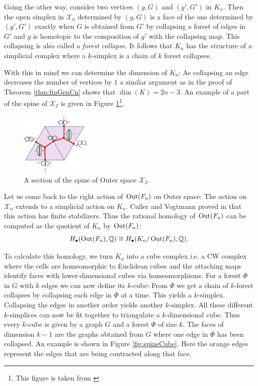 Going the other way, consider two vertices $(g,G)$ and $(g',G')$ in $K_{n}$. Then the open simplex in $\mathcal{X}_{n}$ 
determined by $(g,G)$ is a face of  the one determined by $(g',G')$ exactly when $G$ is obtained from $G'$ 
by collapsing a forest of edges in $G'$ and  $g$ is homotopic to the composition of $g'$ with the collapsing map.
This collapsing is also called a \emph{forest collapse}.
It follows that $K_{n}$ has the structure of a simplicial complex where a $k$-simplex is a chain of $k$ forest collapses. 

With this in mind we can determine the dimension of $K_{n}$: As collapsing an edge decreases the number of vertices by $1$
a similar argument as in the proof of Theorem \ref{thm:finGenCn} shows that $\dim(K) = 2n -3$.
An example of a part of the spine of $\mathcal{X}_{2}$ is given in Figure \ref{fig:SpineOfXn}\footnote{This figure is taken from \cite{vogtmann02}}. 

\begin{figure}[h]
	\centering
	\includegraphics[width=0.3\textwidth]{./Images/spineOfOuterSpace.pdf}
	\caption{A section of the spine of Outer space $\mathcal{X}_{2}$.}
	\label{fig:SpineOfXn}
\end{figure}

Let us come back to the right action of $\operatorname{Out}(F_{n})$ on Outer space: The action on $\mathcal{X}_{n}$ extends to a simplicial action on $K_{n}$.
Culler and Vogtmann proved in \cite{vogtmann86} that this action has finite stabilizers.
Thus the rational homology of $\operatorname{Out}(F_{n})$ can be computed as the quotient of $K_{n}$ by $\operatorname{Out}(F_{n})$:
\[
	H_{\bullet}(\operatorname{Out}(F_{n}),\mathbb{Q}) \cong H_{\bullet}(K_{n}/ \operatorname{Out}(F_{n}),\mathbb{Q})
.\] 

To calculate this homology, we turn $K_{n}$ into a cube complex i.e. a CW complex where the cells are homeomorphic
to Euclidean cubes and the attaching maps identify faces with lower-dimensional cubes via homeomorphisms.
For a forest $\Phi$ in $G$ with $k$ edges we can now define its $k$-cube:
From $\Phi$ we get a chain of $k$-forest collapses by collapsing each edge in $\Phi$ at a time.
This yields a $k$-simplex. Collapsing the edges in another order yields another $k$-simplex.
All these different $k$-simplices can now be fit together to triangulate a $k$-dimensional cube.
Thus every $k$-cube is given by a graph $G$ and a forest $\Phi$ of size $k$.
The faces of dimension $k-1$ are the graphs obtained from $G$ where one edge in $\Phi$ has been collapsed.
An example is shown in Figure \ref{fig:spineCube}. Here the orange edges represent the edges that are being contracted along that face.


